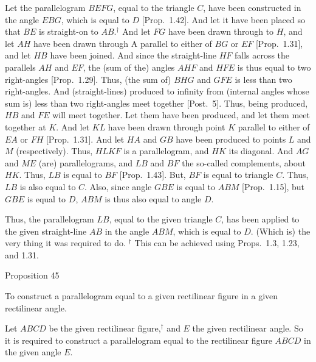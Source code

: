 Let the parallelogram $BEFG$, equal to the triangle $C$, have been
constructed in the angle $EBG$, which is equal to $D$ [Prop.~1.42].
And let it have been placed so that $BE$ is straight-on to $AB$.$^\dag$  And
let $FG$ have been drawn through to $H$, and let $AH$ have been
drawn through A parallel to either of $BG$ or $EF$ [Prop.~1.31], and
let $HB$ have been joined. And since the straight-line $HF$ falls across the
parallels $AH$ and $EF$, the (sum of the) angles $AHF$ and $HFE$ is thus equal to
two right-angles [Prop.~1.29]. Thus, (the sum of) $BHG$ and $GFE$ is less than two
right-angles.
And (straight-lines) produced to
infinity from (internal angles whose sum is) less than two right-angles meet together [Post.~5].
Thus, being produced, $HB$ and $FE$ will meet together. Let them have
been produced, and let them meet together at $K$. And let $KL$ have been
drawn through point $K$ parallel to either of $EA$ or $FH$ [Prop.~1.31]. And
let $HA$ and $GB$ have been produced to points $L$ and $M$ (respectively). Thus, $HLKF$ is a parallelogram, and $HK$ its diagonal. And $AG$ and $ME$ (are) parallelograms, and $LB$ and $BF$ the so-called complements, about $HK$. Thus, $LB$ is
equal to $BF$ [Prop.~1.43]. But, $BF$ is equal to triangle $C$. Thus, $LB$ is also
equal to $C$. Also, since angle $GBE$ is equal to $ABM$ [Prop.~1.15], but
$GBE$ is equal to $D$, $ABM$ is thus also equal to angle $D$.

Thus, the parallelogram $LB$, equal to the
given triangle $C$, has been applied to the given straight-line
$AB$ in the angle $ABM$, which is equal to $D$. (Which is) the very thing it was required to do.
{\footnotesize \noindent$^\dag$ This can be achieved using Props.~1.3, 1.23, and 1.31.}


\begin{center}
{\large Proposition 45}
\end{center}

To construct a parallelogram equal to a given rectilinear figure in a given
rectilinear angle.

Let $ABCD$ be the given rectilinear figure,$^\dag$ and $E$ the given rectilinear angle.
So it is required to construct a parallelogram equal to the rectilinear figure
$ABCD$ in the given angle $E$.

